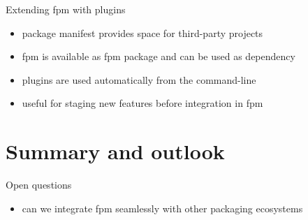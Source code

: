 \documentclass[lualatex,10pt,aspectratio=169]{beamer}
\begin{document}
\begin{frame}{Extending fpm with plugins}
   \begin{itemize}
      \item package manifest provides space for third-party projects
      \item fpm is available as fpm package and can be used as dependency
      \item plugins are used automatically from the command-line
      \item useful for staging new features before integration in fpm
   \end{itemize}
   \vfill

\end{frame}


\section{Summary and outlook}

\begin{frame}{Open questions}
   \begin{itemize}
      \item can we integrate fpm seamlessly with other packaging ecosystems
   \end{itemize}
\end{frame}
\end{document}
